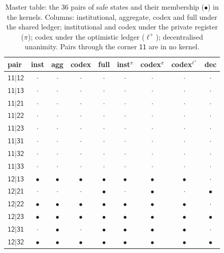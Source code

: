 \documentclass[11pt,a4paper]{article}
\theoremstyle{plain}
\theoremstyle{definition}
\theoremstyle{remark}
\newcommand{\st}[1]{\mathsf{#1}}
\newcommand{\priv}{\pi}
\newcommand{\opt}{\ell^{+}}
\begin{document}
\begin{table}[H]
\centering\footnotesize
\caption{Master table: the $36$ pairs of safe states and their membership ($\bullet$) in the kernels. Columns: institutional, aggregate, codex and full under the shared ledger; institutional and codex under the private register ($\priv$); codex under the optimistic ledger ($\opt$); decentralised unanimity. Pairs through the corner $\st{11}$ are in no kernel.}
\label{tab:master}
\begin{tabular}{lcccccccc}
\toprule
pair & inst & agg & codex & full & inst$^{\priv}$ & codex$^{\priv}$ & codex$^{\opt}$ & dec \\
\midrule
$\st{11|12}$ & $\cdot$ & $\cdot$ & $\cdot$ & $\cdot$ & $\cdot$ & $\cdot$ & $\cdot$ & $\cdot$ \\
$\st{11|13}$ & $\cdot$ & $\cdot$ & $\cdot$ & $\cdot$ & $\cdot$ & $\cdot$ & $\cdot$ & $\cdot$ \\
$\st{11|21}$ & $\cdot$ & $\cdot$ & $\cdot$ & $\cdot$ & $\cdot$ & $\cdot$ & $\cdot$ & $\cdot$ \\
$\st{11|22}$ & $\cdot$ & $\cdot$ & $\cdot$ & $\cdot$ & $\cdot$ & $\cdot$ & $\cdot$ & $\cdot$ \\
$\st{11|23}$ & $\cdot$ & $\cdot$ & $\cdot$ & $\cdot$ & $\cdot$ & $\cdot$ & $\cdot$ & $\cdot$ \\
$\st{11|31}$ & $\cdot$ & $\cdot$ & $\cdot$ & $\cdot$ & $\cdot$ & $\cdot$ & $\cdot$ & $\cdot$ \\
$\st{11|32}$ & $\cdot$ & $\cdot$ & $\cdot$ & $\cdot$ & $\cdot$ & $\cdot$ & $\cdot$ & $\cdot$ \\
$\st{11|33}$ & $\cdot$ & $\cdot$ & $\cdot$ & $\cdot$ & $\cdot$ & $\cdot$ & $\cdot$ & $\cdot$ \\
$\st{12|13}$ & $\bullet$ & $\bullet$ & $\bullet$ & $\bullet$ & $\bullet$ & $\bullet$ & $\bullet$ & $\cdot$ \\
$\st{12|21}$ & $\cdot$ & $\cdot$ & $\cdot$ & $\bullet$ & $\cdot$ & $\bullet$ & $\cdot$ & $\bullet$ \\
$\st{12|22}$ & $\bullet$ & $\bullet$ & $\bullet$ & $\bullet$ & $\bullet$ & $\bullet$ & $\bullet$ & $\cdot$ \\
$\st{12|23}$ & $\bullet$ & $\bullet$ & $\bullet$ & $\bullet$ & $\bullet$ & $\bullet$ & $\bullet$ & $\bullet$ \\
$\st{12|31}$ & $\cdot$ & $\bullet$ & $\cdot$ & $\bullet$ & $\bullet$ & $\bullet$ & $\bullet$ & $\cdot$ \\
$\st{12|32}$ & $\bullet$ & $\bullet$ & $\bullet$ & $\bullet$ & $\bullet$ & $\bullet$ & $\bullet$ & $\bullet$ \\

\end{tabular}
\end{table}
\end{document}
